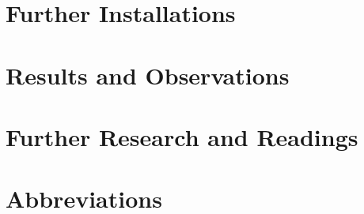 \documentclass[english]{report}
\begin{document}


\chapter{Further Installations}



\chapter{Results and Observations}



\chapter{Further Research and Readings}



\appendix

%


\chapter{Abbreviations}

\printacronyms[include-classes=abbrev,name=]

\newpage


%




\end{document}
